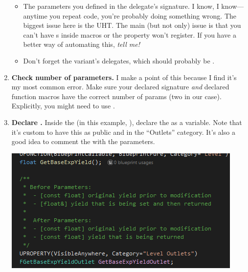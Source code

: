 \begin{enumerate}
{\begin{itemize}
{\begin{tcolorbox}[colback=gray!20!white,colframe=blue!75!black,title=Priorities]
	 \end{tcolorbox}\vspace*{12pt}
			}
			\item{The parameters you defined in the delegate's signature. I know, I know---anytime you repeat code, you're probably doing something wrong. The biggest issue here is the UHT. The main (but not only) issue is that you can't have s inside macros or the property won't register. If you have a better way of automating this, \textit{tell me!}}
			\item{Don't forget the  variant's delegates, which should probably be .}
		\end{itemize}
	}
	\item{\textbf{Check number of parameters.} I make a point of this because I find it's my most common error. Make sure your declared signature \textit{and} declared  function macros have the correct number of params (two in our case). Explicitly, you might need to use .}
	\item{\textbf{Declare .} Inside the  (in this example, ), declare the  as a variable. Note that it's custom to have this  as public and in the ``Outlets'' category. It's also a good idea to comment the  with the parameters.
	\begin{center}
		\includegraphics[scale=\ScreenshotScale]{create-outlet-uproperty}
	\end{center}
	
}
\end{enumerate}
